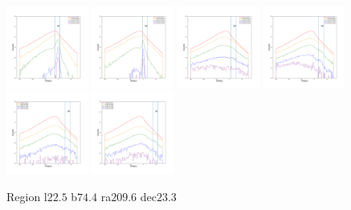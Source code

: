 \documentclass[12pt,prd]{article}
\begin{document}
\begin{figure}[h!]
\includegraphics[width=0.24\textwidth]{../figures/scanning_plotsgaiascan_l22_5_b74_4_ra209_6_dec23_3_npy_12.pdf}
\includegraphics[width=0.24\textwidth]{../figures/scanning_plotsgaiascan_l22_5_b74_4_ra209_6_dec23_3_npy_13.pdf}
\includegraphics[width=0.24\textwidth]{../figures/scanning_plotsgaiascan_l22_5_b74_4_ra209_6_dec23_3_npy_14.pdf}
\includegraphics[width=0.24\textwidth]{../figures/scanning_plotsgaiascan_l22_5_b74_4_ra209_6_dec23_3_npy_15.pdf}
\includegraphics[width=0.24\textwidth]{../figures/scanning_plotsgaiascan_l22_5_b74_4_ra209_6_dec23_3_npy_16.pdf}
\includegraphics[width=0.24\textwidth]{../figures/scanning_plotsgaiascan_l22_5_b74_4_ra209_6_dec23_3_npy_17.pdf}
\caption{Region l$22.5$ b$74.4$ ra$209.6$ dec$23.3$}
\end{figure}
\end{document}
